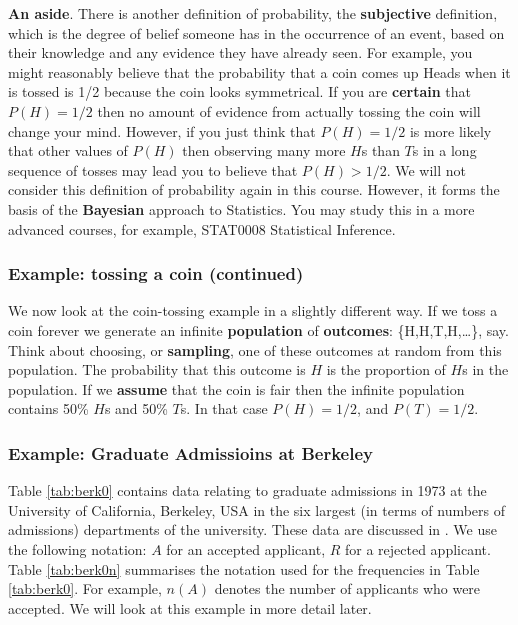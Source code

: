 \documentclass[
  british,
]{book}
\begin{document}
\textbf{An aside}. There is another definition of probability, the \textbf{subjective} definition, which is the degree of belief someone has in the occurrence of an event, based on their knowledge and any evidence they have already seen. For example, you might reasonably believe that the probability that a coin comes up Heads when it is tossed is 1/2 because the coin looks symmetrical. If you are \textbf{certain} that \(P(H)=1/2\) then no amount of evidence from actually tossing the coin will change your mind. However, if you just think that \(P(H)=1/2\) is more likely that other values of \(P(H)\) then observing many more \(H\)s than \(T\)s in a long sequence of tosses may lead you to believe that \(P(H)>1/2\). We will not consider this definition of probability again in this course. However, it forms the basis of the \textbf{Bayesian} approach to Statistics. You may study this in a more advanced courses, for example, STAT0008 Statistical Inference.

\hypertarget{example-tossing-a-coin-continued}{%
\subsubsection*{Example: tossing a coin (continued)}\label{example-tossing-a-coin-continued}}

We now look at the coin-tossing example in a slightly different way. If we toss a coin forever we generate an infinite \textbf{population} of \textbf{outcomes}: \{H,H,T,H,\ldots \}, say. Think about choosing, or \textbf{sampling}, one of these outcomes at random from this population. The probability that this outcome is \(H\) is the proportion of \(H\)s in the population. If we \textbf{assume} that the coin is fair then the infinite population contains 50\% \(H\)s and 50\% \(T\)s. In that case \(P(H)=1/2\), and \(P(T)=1/2\).

\hypertarget{example-graduate-admissioins-at-berkeley}{%
\subsubsection*{Example: Graduate Admissioins at Berkeley}\label{example-graduate-admissioins-at-berkeley}}

Table \ref{tab:berk0} contains data relating to graduate admissions in 1973 at the University of California, Berkeley, USA in the six largest (in terms of numbers of admissions) departments of the university. These data are discussed in \citet{berkeley}. We use the following notation: \(A\) for an accepted applicant, \(R\) for a rejected applicant. Table \ref{tab:berk0n} summarises the notation used for the frequencies in Table \ref{tab:berk0}. For example, \(n(A)\) denotes the number of applicants who were accepted. We will look at this example in more detail later.
\end{document}
